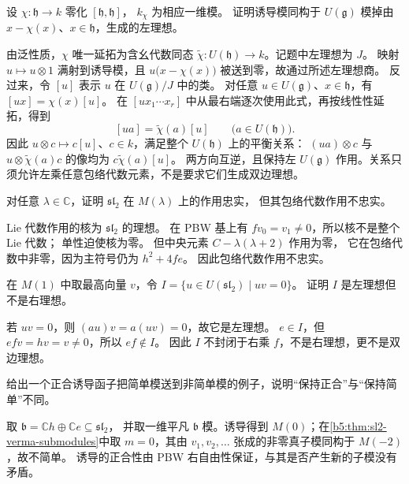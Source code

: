\begin{exercise}\label{b5:ex:15-induced-cyclic-relations}
	设 \(\chi:\mathfrak h\to k\) 零化 \([\mathfrak h,\mathfrak h]\)， \(k_\chi\) 为相应一维模。 证明诱导模同构于 \(U(\mathfrak g)\) 模掉由 \(x-\chi(x)\)、\(x\in\mathfrak h\)，生成的左理想。
\end{exercise}
\begin{solution}
	由泛性质，\(\chi\) 唯一延拓为含幺代数同态 \(\widetilde\chi:U(\mathfrak h)\to k\)。记题中左理想为 \(J\)。 映射 \(u\mapsto u\otimes1\) 满射到诱导模，且 \(u\bigl(x-\chi(x)\bigr)\) 被送到零，故通过所述左理想商。 反过来，令 \([u]\) 表示 \(u\) 在 \(U(\mathfrak g)/J\) 中的类。 对任意 \(u\in U(\mathfrak g)\)、\(x\in\mathfrak h\)，有 \([ux]=\chi(x)[u]\)。 在 \([ux_1\cdots x_r]\) 中从最右端逐次使用此式，再按线性性延拓，得到
	\[
		[ua]=\widetilde\chi(a)[u]\qquad\bigl(a\in U(\mathfrak h)\bigr).
	\]
	因此 \(u\otimes c\mapsto c[u]\)、\(c\in k\)，满足整个 \(U(\mathfrak h)\) 上的平衡关系： \((ua)\otimes c\) 与 \(u\otimes\widetilde\chi(a)c\) 的像均为 \(c\widetilde\chi(a)[u]\)。 两方向互逆，且保持左 \(U(\mathfrak g)\) 作用。关系只须允许左乘任意包络代数元素，不是要求它们生成双边理想。
\end{solution}

\begin{exercise}\label{b5:ex:15-verma-faithfulness}
	对任意 \(\lambda\in\mathbb C\)，证明 \(\mathfrak{sl}_2\) 在 \(M(\lambda)\) 上的作用忠实， 但其包络代数作用不忠实。
\end{exercise}
\begin{solution}
	Lie 代数作用的核为 \(\mathfrak{sl}_2\) 的理想。 在 PBW 基上有 \(fv_0=v_1\ne0\)，所以核不是整个 Lie 代数； 单性迫使核为零。 但中央元素 \(C-\lambda(\lambda+2)\) 作用为零， 它在包络代数中非零，因为主符号仍为 \(h^2+4fe\)。 因此包络代数作用不忠实。
\end{solution}

\begin{exercise}\label{b5:ex:15-verma-left-not-two-sided}
	在 \(M(1)\) 中取最高向量 \(v\)，令 \(I=\bigl\{u\in U(\mathfrak{sl}_2)\mid uv=0\bigr\}\)。 证明 \(I\) 是左理想但不是右理想。
\end{exercise}
\begin{solution}
	若 \(uv=0\)，则 \((au)v=a(uv)=0\)，故它是左理想。 \(e\in I\)，但 \(efv=hv=v\ne0\)，所以 \(ef\notin I\)。 因此 \(I\) 不封闭于右乘 \(f\)，不是右理想，更不是双边理想。
\end{solution}

\begin{exercise}\label{b5:ex:15-induction-not-simple}
	给出一个正合诱导函子把简单模送到非简单模的例子，说明“保持正合”与“保持简单”不同。
\end{exercise}
\begin{solution}
	取 \(\mathfrak b=\mathbb Ch\oplus\mathbb Ce\subseteq\mathfrak{sl}_2\)， 并取一维平凡 \(\mathfrak b\) 模。诱导得到 \(M(0)\)；在\cref{b5:thm:sl2-verma-submodules}中取 \(m=0\)，其由 \(v_1,v_2,\ldots\) 张成的非零真子模同构于 \(M(-2)\)，故不简单。 诱导的正合性由 PBW 右自由性保证，与其是否产生新的子模没有矛盾。
\end{solution}

